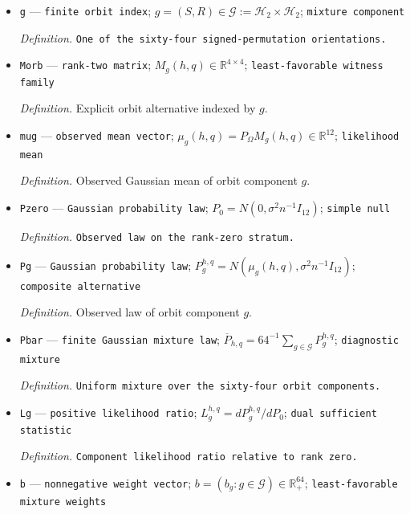 \documentclass{article}
\begin{document}
\begin{itemize}
  \par\smallskip\noindent\emph{Definition.} Bound-compatible orbit amplitudes defined in \(\mathrm{def:admissible-orbit-amplitudes}\).
  \item \texttt{g} --- \texttt{finite orbit index}; \(g=(S,R)\in\mathcal G:=\mathcal H_2\times\mathcal H_2\); \texttt{mixture component}
  \par\smallskip\noindent\emph{Definition.} \texttt{One of the sixty-\allowbreak{}four signed-\allowbreak{}permutation orientations.}
  \item \texttt{Morb} --- \texttt{rank-\allowbreak{}two matrix}; \(M_g(h,q)\in\mathbb R^{4\times4}\); \texttt{least-\allowbreak{}favorable witness family}
  \par\smallskip\noindent\emph{Definition.} Explicit orbit alternative indexed by \(g\).
  \item \texttt{mug} --- \texttt{observed mean vector}; \(\mu_g(h,q)=P_{\Omega}M_g(h,q)\in\mathbb R^{12}\); \texttt{likelihood mean}
  \par\smallskip\noindent\emph{Definition.} Observed Gaussian mean of orbit component \(g\).
  \item \texttt{Pzero} --- \texttt{Gaussian probability law}; \(P_0=N(0,\sigma^2 n^{-1}I_{12})\); \texttt{simple null}
  \par\smallskip\noindent\emph{Definition.} \texttt{Observed law on the rank-\allowbreak{}zero stratum.}
  \item \texttt{Pg} --- \texttt{Gaussian probability law}; \(P_g^{h,q}=N(\mu_g(h,q),\sigma^2 n^{-1}I_{12})\); \texttt{composite alternative}
  \par\smallskip\noindent\emph{Definition.} Observed law of orbit component \(g\).
  \item \texttt{Pbar} --- \texttt{finite Gaussian mixture law}; \(\overline P_{h,q}=64^{-1}\sum_{g\in\mathcal G}P_g^{h,q}\); \texttt{diagnostic mixture}
  \par\smallskip\noindent\emph{Definition.} \texttt{Uniform mixture over the sixty-\allowbreak{}four orbit components.}
  \item \texttt{Lg} --- \texttt{positive likelihood ratio}; \(L_g^{h,q}=dP_g^{h,q}/dP_0\); \texttt{dual sufficient statistic}
  \par\smallskip\noindent\emph{Definition.} \texttt{Component likelihood ratio relative to rank zero.}
  \item \texttt{b} --- \texttt{nonnegative weight vector}; \(b=(b_g:g\in\mathcal G)\in\mathbb R_+^{64}\); \texttt{least-\allowbreak{}favorable mixture weights}

\end{itemize}
\end{document}

